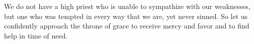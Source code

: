 \lettrine[lines=3]{W}{}e do not have a high priest who is unable to sympathize with our weaknesses, but one who was tempted in every way that we are, yet never sinned. So let us confidently approach the throne of grace to receive mercy and favor and to find help in time of need.
